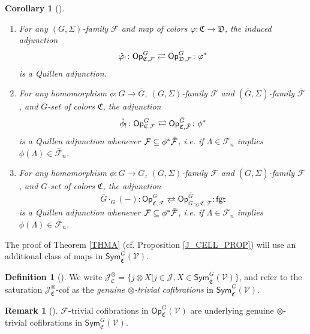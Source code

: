 \documentclass[a4paper,10pt
,draft
]{article}%
\numberwithin{equation}{section}
\numberwithin{figure}{section}
\newtheorem{corollary}[equation]{Corollary}%
\theoremstyle{definition} %
\newtheorem{definition}[equation]{Definition}%
\newtheorem{remark}[equation]{Remark}%
\newcommand{\Op}{\mathsf{Op}}%
\newcommand{\F}{\ensuremath{\mathcal F}}
\newcommand{\V}{\ensuremath{\mathcal V}}
\newcommand{\1}{\ensuremath{\mathbbm 1}}%
\begin{document}
\begin{corollary}[{\cite[Cor. \ref{OC-OPADJ_COR}]{BP_FCOP}}]
	\label{OPADJ_COR}
	\begin{enumerate}[label=(\roman*)]
		\item \label{OPCOCHADJ_LBL}
		For any $(G,\Sigma)$-family $\F$ and map of colors 
		$\varphi \colon \mathfrak C \to \mathfrak D$, the induced adjunction
		\[
		\check{\varphi}_! \colon \mathsf{Op}^G_{\mathfrak{C},\F}
		\rightleftarrows
		\mathsf{Op}^G_{\mathfrak{D},\F} \colon \varphi^{\**}
		\]
		is a Quillen adjunction.
		\item \label{OPFIXSETCHGR_LBL}
		For any homomorphism $\phi \colon G \to \bar G$,
		$(G,\Sigma)$-family $\F$ and $(\bar G,\Sigma)$-family $\bar{\F}$,
		and $\bar G$-set of colors $\mathfrak C$,
		the adjunction
		\[
		\check{\phi}_! \colon \mathsf{Op}^G_{\mathfrak{C},\F}
		\rightleftarrows
		\mathsf{Op}^{\bar{G}}_{\mathfrak{C},\bar{\F}} \colon \phi^{\**}
		\]
		is a Quillen adjunction whenever $\F \subseteq \phi^{\**} \bar{\F}$, i.e.
		if $\Lambda \in \F_n$ implies 
		$\phi(\Lambda) \in \bar{\F}_n$.
		\item \label{OPCOMBADJ_LBL}
		For any homomorphism $\phi \colon G \to \bar G$,
		$(G,\Sigma)$-family $\F$ and $(\bar G,\Sigma)$-family $\bar{\F}$,
		and $G$-set of colors $\mathfrak C$,
		the adjunction
		\[
		\bar{G} \cdot_G (-) \colon \mathsf{Op}^G_{\mathfrak{C},\F}
		\rightleftarrows
		\mathsf{Op}^{\bar{G}}_{\bar{G} \cdot_G \mathfrak{C},\bar{\F}} \colon \mathsf{fgt}
		\]
		is a Quillen adjunction whenever $\F \subseteq \phi^{\**} \bar{\F}$, i.e.
		if $\Lambda \in \F_n$ implies 
		$\phi(\Lambda) \in \bar{\F}_n$.
	\end{enumerate}
\end{corollary}


The proof of Theorem \ref{THMA}
(cf. Proposition \ref{J_CELL_PROP})
will use an additional class of maps in
$\mathsf{Sym}^G_{\mathfrak C}(\V)$.


\begin{definition}[{\cite[Def. \ref{OC-GGENOTITC DEF}]{BP_FCOP}}]
	\label{GGENOTITC DEF}
	We write 
	$\mathcal{J}^{\otimes}_{\mathfrak{C}}=
	\{j \otimes X | j \in \mathcal{J}, X \in \mathsf{Sym}^G_{\mathfrak C}(\V)\}$,
	and refer to the saturation
	$\mathcal{J}^{\otimes}_{\mathfrak{C}}$-cof
	as the \emph{genuine $\otimes$-trivial cofibrations}
	in $\mathsf{Sym}^G_{\mathfrak C}(\V)$.	
\end{definition}

\begin{remark}[{\cite[Rem. \ref{OC-GOTC_REM}]{BP_FCOP}}]
	\label{GOTC_REM}
	$\F$-trivial cofibrations in $\Op^G_{\mathfrak C}(\V)$ are underlying genuine $\otimes$-trivial cofibrations
	in $\mathsf{Sym}^G_{\mathfrak C}(\V)$.
\end{remark}
\end{document}
